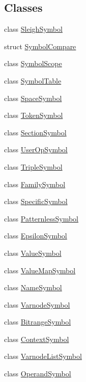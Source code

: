 \subsection*{Classes}
\begin{DoxyCompactItemize}
\item 
class \mbox{\hyperlink{class_sleigh_symbol}{Sleigh\+Symbol}}
\item 
struct \mbox{\hyperlink{struct_symbol_compare}{Symbol\+Compare}}
\item 
class \mbox{\hyperlink{class_symbol_scope}{Symbol\+Scope}}
\item 
class \mbox{\hyperlink{class_symbol_table}{Symbol\+Table}}
\item 
class \mbox{\hyperlink{class_space_symbol}{Space\+Symbol}}
\item 
class \mbox{\hyperlink{class_token_symbol}{Token\+Symbol}}
\item 
class \mbox{\hyperlink{class_section_symbol}{Section\+Symbol}}
\item 
class \mbox{\hyperlink{class_user_op_symbol}{User\+Op\+Symbol}}
\item 
class \mbox{\hyperlink{class_triple_symbol}{Triple\+Symbol}}
\item 
class \mbox{\hyperlink{class_family_symbol}{Family\+Symbol}}
\item 
class \mbox{\hyperlink{class_specific_symbol}{Specific\+Symbol}}
\item 
class \mbox{\hyperlink{class_patternless_symbol}{Patternless\+Symbol}}
\item 
class \mbox{\hyperlink{class_epsilon_symbol}{Epsilon\+Symbol}}
\item 
class \mbox{\hyperlink{class_value_symbol}{Value\+Symbol}}
\item 
class \mbox{\hyperlink{class_value_map_symbol}{Value\+Map\+Symbol}}
\item 
class \mbox{\hyperlink{class_name_symbol}{Name\+Symbol}}
\item 
class \mbox{\hyperlink{class_varnode_symbol}{Varnode\+Symbol}}
\item 
class \mbox{\hyperlink{class_bitrange_symbol}{Bitrange\+Symbol}}
\item 
class \mbox{\hyperlink{class_context_symbol}{Context\+Symbol}}
\item 
class \mbox{\hyperlink{class_varnode_list_symbol}{Varnode\+List\+Symbol}}
\item 
class \mbox{\hyperlink{class_operand_symbol}{Operand\+Symbol}}
\item 

\end{DoxyCompactItemize}
